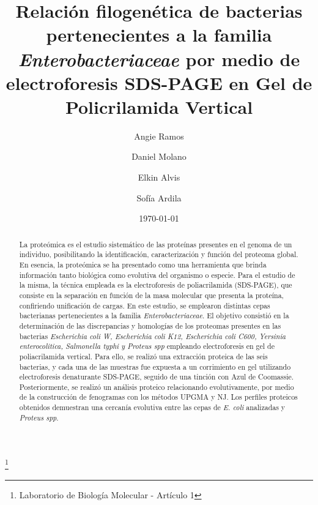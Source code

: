 \documentclass[%
 reprint,
 amsmath,amssymb,
 aps,
showkeys,
letter,
12pts
]{revtex4-1}
\begin{document}

\title{Relación filogenética de bacterias pertenecientes a la familia \textit{Enterobacteriaceae} por medio de electroforesis SDS-PAGE en Gel de Policrilamida Vertical}%
\thanks{Laboratorio de Biología Molecular - Artículo 1}%

\author{Angie Ramos}
\author{Daniel Molano}%
\author{Elkin Alvis}
\author{Sof\'ia Ardila}

%


\date[Fecha: ]{\today}%

\begin{abstract} %
	La proteómica es el estudio sistemático de las proteínas presentes en el genoma de un individuo, posibilitando la identificación, caracterización y función del proteoma global. En esencia, la proteómica se ha presentado como una herramienta que brinda información tanto biológica como evolutiva del organismo o especie. Para el estudio de la misma, la técnica empleada es la electroforesis de poliacrilamida (SDS-PAGE), que consiste en la separación en función de la masa molecular que presenta la proteína, confiriendo unificación de cargas. En este estudio, se emplearon distintas cepas bacterianas pertenecientes a la familia \textit{Enterobacteriaceae}. El objetivo consistió en la determinación de las discrepancias y homologías de los proteomas presentes en  las bacterias \textit{Escherichia coli W, Escherichia coli K12, Escherichia coli C600, Yersinia enterocolitica, Salmonella typhi y Proteus spp} empleando electroforesis en gel de poliacrilamida vertical. Para ello, se realizó una extracción proteica de las seis bacterias, y cada una de las muestras fue expuesta a un corrimiento en gel utilizando electroforesis denaturante SDS-PAGE, seguido de una tinción con Azul de Coomassie. Posteriormente, se realizó un análisis proteico relacionando evolutivamente, por medio de la construcción de fenogramas con los métodos UPGMA y NJ. Los perfiles proteicos obtenidos demuestran una cercanía evolutiva entre las cepas de \textit{E. coli} analizadas y \textit{Proteus spp}.
	 
\end{abstract}
\end{document}
